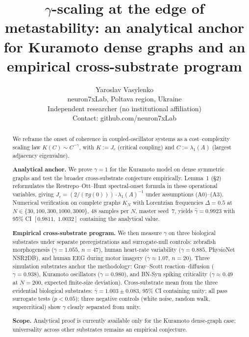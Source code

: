 \documentclass[11pt,a4paper,twocolumn]{article}
\begin{document}
\title{\LARGE\bfseries $\gamma$-scaling at the edge of metastability: an analytical anchor for Kuramoto dense graphs and an empirical cross-substrate program}
\author{Yaroslav Vasylenko\\[0.2em]
\small neuron7xLab, Poltava region, Ukraine\\
\small Independent researcher (no institutional affiliation)\\
\small Contact: github.com/neuron7xLab}
\date{}
\maketitle

\begin{abstract}
\noindent We reframe the onset of coherence in coupled-oscillator systems as a cost--complexity scaling law $K(C) \sim C^{-\gamma}$, with $K := J_c$ (critical coupling) and $C := \lambda_1(A)$ (largest adjacency eigenvalue).

\medskip
\noindent\textbf{Analytical anchor.}
We prove $\gamma = 1$ for the Kuramoto model on dense symmetric graphs and test the broader cross-substrate conjecture empirically. Lemma~1 (§2) reformulates the Restrepo--Ott--Hunt spectral-onset formula in these operational variables, giving $J_c = (2/(\pi g(0)))\cdot \lambda_1(A)^{-1}$ under assumptions (A0)--(A3). Numerical verification on complete graphs $K_N$ with Lorentzian frequencies $\Delta = 0.5$ at $N \in \{30, 100, 300, 1000, 3000\}$, 48 samples per $N$, master seed~$7$, yields $\hat\gamma = 0.9923$ with 95\% CI $[0.9811,\; 1.0032]$ containing the analytical value.

\medskip
\noindent\textbf{Empirical cross-substrate program.}
We then measure $\gamma$ on three biological substrates under separate preregistrations and surrogate-null controls: zebrafish morphogenesis ($\gamma = 1.055$, $n = 47$), human heart-rate variability ($\gamma = 0.885$, PhysioNet NSR2DB), and human EEG during motor imagery ($\gamma \approx 1.07$, $n = 20$). Three simulation substrates anchor the methodology: Gray--Scott reaction--diffusion ($\gamma = 0.938$), Kuramoto oscillators ($\gamma = 0.980$), and BN-Syn spiking criticality ($\gamma \approx 0.49$ at $N = 200$, expected finite-size deviation). Cross-substrate mean from the three evidential biological substrates: $\bar\gamma = 1.003 \pm 0.083$, 95\% CI containing unity; all pass surrogate tests ($p < 0.05$); three negative controls (white noise, random walk, supercritical) show $\gamma$ clearly separated from unity.

\medskip
\noindent\textbf{Scope.} Analytical proof is currently available only for the Kuramoto dense-graph case; universality across other substrates remains an empirical conjecture.
\end{abstract}
\end{document}
